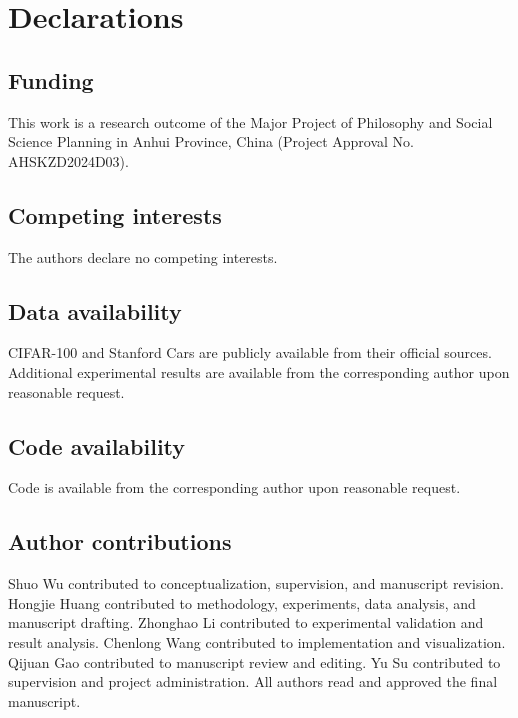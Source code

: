 \documentclass[pdflatex,iicol,sn-mathphys-num]{sn-jnl}
\theoremstyle{thmstyleone}%
\theoremstyle{thmstyletwo}%
\theoremstyle{thmstylethree}%
\begin{document}
\section*{Declarations}

\subsection*{Funding}
This work is a research outcome of the Major Project of Philosophy and Social Science Planning in Anhui Province, China (Project Approval No. AHSKZD2024D03).

\subsection*{Competing interests}
The authors declare no competing interests.

\subsection*{Data availability}
CIFAR-100 and Stanford Cars are publicly available from their official sources. Additional experimental results are available from the corresponding author upon reasonable request.

\subsection*{Code availability}
Code is available from the corresponding author upon reasonable request.

\subsection*{Author contributions}
Shuo Wu contributed to conceptualization, supervision, and manuscript revision. 
Hongjie Huang contributed to methodology, experiments, data analysis, and manuscript drafting. 
Zhonghao Li contributed to experimental validation and result analysis. 
Chenlong Wang contributed to implementation and visualization. 
Qijuan Gao contributed to manuscript review and editing. 
Yu Su contributed to supervision and project administration. 
All authors read and approved the final manuscript.
\end{document}
